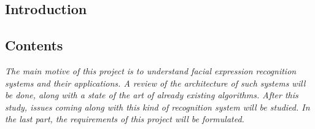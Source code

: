   \begin{titlepage}
    \vspace*{\fill}
      \part{Introduction}
    \vspace*{\fill}
  \end{titlepage}

\startcontents[parts]

\chapter*{Contents}

\textit{The main motive of this project is to understand facial expression recognition systems and their applications. A review of the architecture of such systems will be done, along with a state of the art of already existing algorithms. After this study, issues coming along with this kind of recognition system will be studied. In the last part, the requirements of this project will be formulated.}

\vspace{\baselineskip}


\pagebreak


\newpage


\stopcontents[parts]
